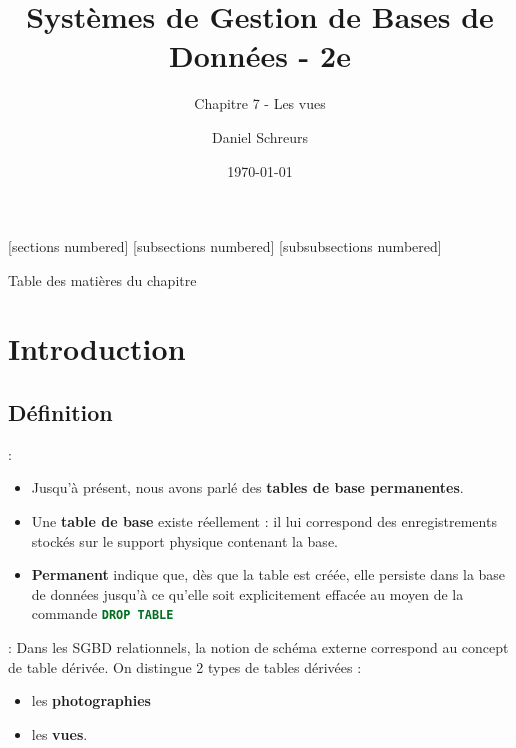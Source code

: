 \documentclass[10pt]{beamer}
\title{Systèmes de Gestion de Bases de Données - 2e}
\subtitle{Chapitre 7 - Les vues}
\date{\today}
\author{Daniel Schreurs}
\institute{Haute École de Province de Liège}
\begin{document}
\maketitle

[sections numbered]
[subsections numbered]
[subsubsections numbered]
\begin{frame}[allowframebreaks]{Table des matières du chapitre}
    \tableofcontents[subsectionstyle=show/show/hide,subsubsectionstyle=show/show/hide,]
\end{frame}

\section{Introduction}
\tocss
\subsection{Définition}
\begin{frame}{\secname : \subsecname}
    \begin{itemize}
        \item Jusqu'à présent, nous avons parlé des \textbf{tables de base permanentes}.
        \item Une \textbf{table de base} existe réellement : il lui correspond des enregistrements stockés sur le support physique contenant la base.
        \item \textbf{Permanent} indique que, dès que la table est créée, elle persiste dans la base de données jusqu'à ce qu'elle soit explicitement effacée au moyen de la commande \lstinline[language=sql]!DROP TABLE!
    \end{itemize}
\end{frame}

\begin{frame}{\secname : \subsecname}
    Dans les SGBD relationnels, la notion de schéma externe correspond au concept de table dérivée.  On distingue 2 types de tables dérivées :
    \begin{itemize}
        \item les \textbf{photographies}
        \item les \textbf{vues}.
    \end{itemize}
\end{frame}
\end{document}
